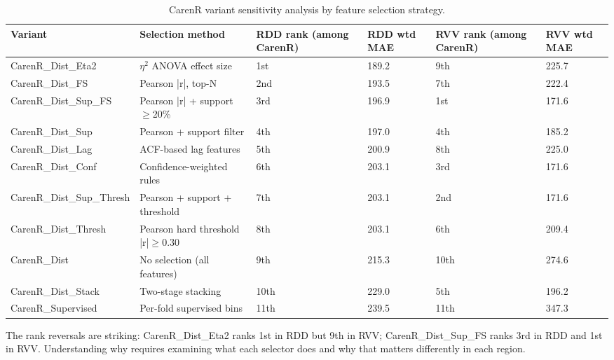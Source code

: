 \begin{table}[htbp]
  \centering
  \caption{CarenR variant sensitivity analysis by feature selection strategy.}\label{tab:ch5c_1}
  \small
  \begin{adjustbox}{max width=\textwidth}
    \begin{tabularx}{\textwidth}{p{3.2cm}|p{3.6cm}|p{1.7cm}|p{1.5cm}|p{1.7cm}|X}
  \toprule
  Variant & Selection method & RDD rank
(among CarenR) & RDD wtd MAE & RVV rank
(among CarenR) & RVV wtd MAE \\
  \midrule
  CarenR\_Dist\_Eta2 & $\eta$$^2$ ANOVA effect size & 1st & 189.2 & 9th & 225.7 \\
  CarenR\_Dist\_FS & Pearson |r|, top-N & 2nd & 193.5 & 7th & 222.4 \\
  CarenR\_Dist\_Sup\_FS & Pearson |r| + support $\geq$20\% & 3rd & 196.9 & 1st & 171.6 \\
  CarenR\_Dist\_Sup & Pearson + support filter & 4th & 197.0 & 4th & 185.2 \\
  CarenR\_Dist\_Lag & ACF-based lag features & 5th & 200.9 & 8th & 225.0 \\
  CarenR\_Dist\_Conf & Confidence-weighted rules & 6th & 203.1 & 3rd & 171.6 \\
  CarenR\_Dist\_Sup\_Thresh & Pearson + support + threshold & 7th & 203.1 & 2nd & 171.6 \\
  CarenR\_Dist\_Thresh & Pearson hard threshold |r|$\geq$0.30 & 8th & 203.1 & 6th & 209.4 \\
  CarenR\_Dist & No selection (all features) & 9th & 215.3 & 10th & 274.6 \\
  CarenR\_Dist\_Stack & Two-stage stacking & 10th & 229.0 & 5th & 196.2 \\
  CarenR\_Supervised & Per-fold supervised bins & 11th & 239.5 & 11th & 347.3 \\
  \bottomrule
\end{tabularx}
  \end{adjustbox}

\end{table}


The rank reversals are striking: CarenR\_Dist\_Eta2 ranks 1st in RDD but 9th in RVV; CarenR\_Dist\_Sup\_FS ranks 3rd in RDD and 1st in RVV. Understanding why requires examining what each selector does and why that matters differently in each region.

